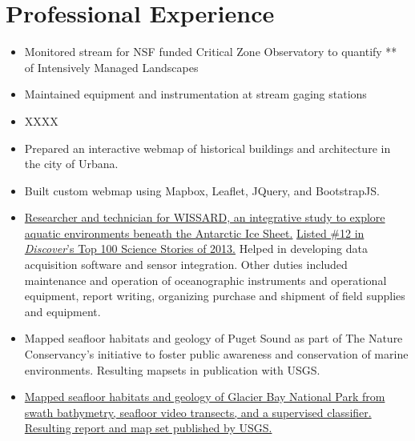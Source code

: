 \section{Professional Experience}


\begin{itemize}
\item Monitored stream  for NSF funded Critical Zone Observatory to quantify ** of Intensively Managed Landscapes 
\item Maintained equipment and instrumentation at stream gaging stations
\item XXXX
\end{itemize}

\begin{itemize}
\item Prepared an interactive webmap of historical buildings and architecture in the city of Urbana.
\item Built custom webmap using Mapbox, Leaflet, JQuery, and BootstrapJS. 

\end{itemize}

\begin{itemize}
\item \href{http://www.wissard.org}{Researcher and technician for WISSARD, an
  integrative study to explore aquatic environments beneath the Antarctic Ice
  Sheet.}
  \href{http://discovermagazine.com/2014/jan-feb/12-the-search-for-life-trapped-under-ice}
       {Listed \#12 in \textit{Discover}'s Top 100 Science Stories of 2013.} Helped in developing data acquisition software and sensor integration.
       Other duties included maintenance and operation of oceanographic instruments and operational equipment,
       report writing, organizing purchase and shipment of field supplies and equipment.
  
\item Mapped seafloor habitats and geology of Puget Sound as part of The Nature
  Conservancy's initiative to foster public awareness and conservation of marine
  environments. Resulting mapsets in publication with USGS.

\item \href{http://pubs.usgs.gov/sim/3253/}{Mapped seafloor habitats and geology
  of Glacier Bay National Park from swath bathymetry, seafloor video transects, and a supervised classifier. Resulting report and map set published by USGS.}
  
\end{itemize}

